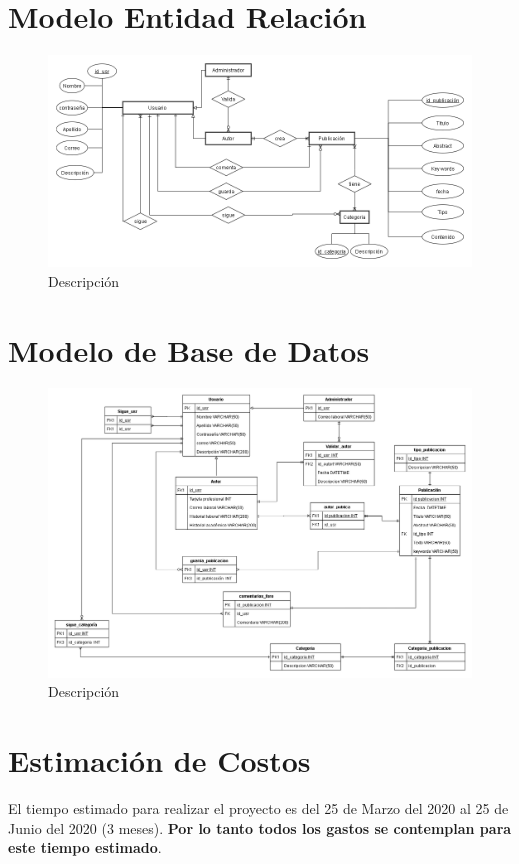 \documentclass[a4paper,12 pt]{article}
\begin{document}
\begin{landscape}
\section{Modelo Entidad Relación}
    \begin{figure}[H]
        \centering
        \includegraphics[scale = 0.7]{images/ERD_v02.png}
        \caption{Descripción}
        \label{F13}
    \end{figure}{}

\section{Modelo de Base de Datos}
    \begin{figure}[H]
        \centering
        \includegraphics[scale = 0.55]{images/BD_v02.png}
        \caption{Descripción}
        \label{F11}
    \end{figure}{}
\end{landscape}

\section{Estimación de Costos}
El tiempo estimado para realizar el proyecto es del 25 de Marzo del 2020 al 25
de Junio del 2020 (3 meses). \textbf{Por lo tanto todos los gastos se contemplan
para este tiempo estimado}.\\
\end{document}
